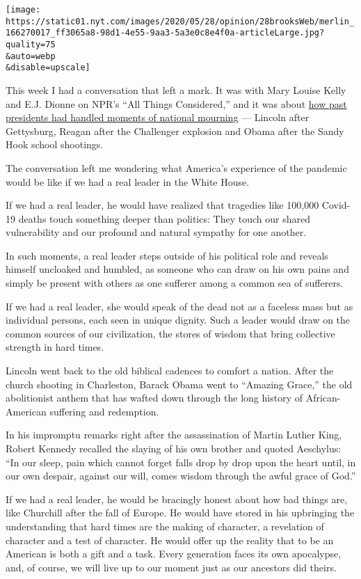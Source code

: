 \texttt{[image: https://static01.nyt.com/images/2020/05/28/opinion/28brooksWeb/merlin\_166270017\_ff3065a8-98d1-4e55-9aa3-5a3e0c8e4f0a-articleLarge.jpg?quality=75\\\&auto=webp\\\&disable=upscale]}

This week I had a conversation that left a mark. It was with Mary Louise
Kelly and E.J. Dionne on NPR's ``All Things Considered,'' and it was
about
\href{https://www.npr.org/2020/05/27/863422824/how-presidents-lead-in-times-of-national-mourning}{how
past presidents had handled moments of national mourning} --- Lincoln
after Gettysburg, Reagan after the Challenger explosion and Obama after
the Sandy Hook school shootings.

The conversation left me wondering what America's experience of the
pandemic would be like if we had a real leader in the White House.

If we had a real leader, he would have realized that tragedies like
100,000 Covid-19 deaths touch something deeper than politics: They touch
our shared vulnerability and our profound and natural sympathy for one
another.

In such moments, a real leader steps outside of his political role and
reveals himself uncloaked and humbled, as someone who can draw on his
own pains and simply be present with others as one sufferer among a
common sea of sufferers.

If we had a real leader, she would speak of the dead not as a faceless
mass but as individual persons, each seen in unique dignity. Such a
leader would draw on the common sources of our civilization, the stores
of wisdom that bring collective strength in hard times.

Lincoln went back to the old biblical cadences to comfort a nation.
After the church shooting in Charleston, Barack Obama went to ``Amazing
Grace,'' the old abolitionist anthem that has wafted down through the
long history of African-American suffering and redemption.

In his impromptu remarks right after the assassination of Martin Luther
King, Robert Kennedy recalled the slaying of his own brother and quoted
Aeschylus: ``In our sleep, pain which cannot forget falls drop by drop
upon the heart until, in our own despair, against our will, comes wisdom
through the awful grace of God.''

If we had a real leader, he would be bracingly honest about how bad
things are, like Churchill after the fall of Europe. He would have
stored in his upbringing the understanding that hard times are the
making of character, a revelation of character and a test of character.
He would offer up the reality that to be an American is both a gift and
a task. Every generation faces its own apocalypse, and, of course, we
will live up to our moment just as our ancestors did theirs.

